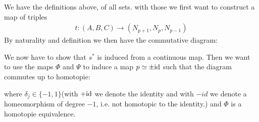 \begin{cor}
	We have the definitions above, of all sets. with those we first want to construct a map of triples
	\begin{align*}
		t:(A,B,C)\to (N_{p+1},N_p,N_{p-1})
	\end{align*} By naturality and definition we then have the commutative diagram: 
	\begin{center}
	\end{center} 
	We now have to show that $s^*$ is induced from a continuous map. Then we want to use the maps $\Phi$ and $\Psi$ to induce a map $p\simeq \pm \text{id} $ such that the diagram commutes up to homotopie:
	\begin{center}
	\end{center} where $\delta_j\in \{-1,1\}$(with $+\text{id}$ we denote the identity and with $-id$ we denote a homeomorphism of degree $-1$, i.e. not homotopic to the identity.) and $\Phi$ is a homotopie equivalence. 

\end{cor}
